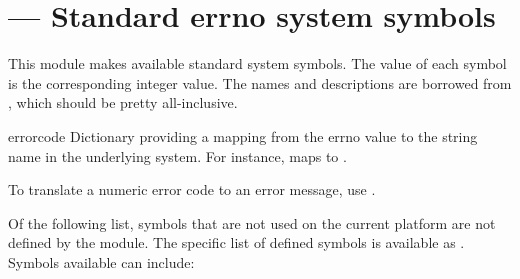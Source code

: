 \section{ ---
         Standard errno system symbols}



This module makes available standard  system symbols.
The value of each symbol is the corresponding integer value.
The names and descriptions are borrowed from ,
which should be pretty all-inclusive.

\begin{datadesc}{errorcode}
  Dictionary providing a mapping from the errno value to the string
  name in the underlying system.  For instance,
   maps to .
\end{datadesc}

To translate a numeric error code to an error message, use
.

Of the following list, symbols that are not used on the current
platform are not defined by the module.  The specific list of defined
symbols is available as .  Symbols
available can include:

